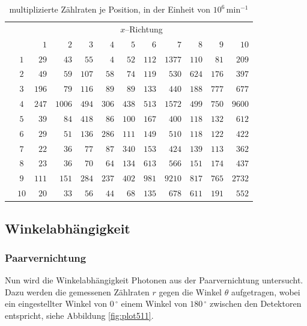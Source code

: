 \documentclass[12pt,a4paper]{scrartcl}
\numberwithin{equation}{section} %
\begin{document}
\begin{table}
	\vspace{24pt}
	\begin{tabular}{cc|rrrrrrrrrr}
		 && \multicolumn{10}{c}{$x$--Richtung} \\
		 && $1$ & $2$ & $3$ & $4$ & $5$ & $6$ & $7$ & $8$ & $9$ & $10$ \\
		 \hline
		\multirow{10}{*}{\rotatebox{90}{$y$--Richtung}} &$1$  & $29$ & $43$ & $55$ & $4$ & $52$ & $112$ & $1377$ & $110$ & $81$ & $209$ \\
		&$2$  & $49$ & $59$ & $107$ & $58$ & $74$ & $119$ & $530$ & $624$ & $176$ & $397$ \\
		&$3$  & $196$ & $79$ & $116$ & $89$ & $89$ & $133$ & $440$ & $188$ & $777$ & $677$ \\
		&$4$  & $247$ & $1006$ & $494$ & $306$ & $438$ & $513$ & $1572$ & $499$ & $750$ & $9600$ \\
		&$5$  & $39$ & $84$ & $418$ & $86$ & $100$ & $167$ & $400$ & $118$ & $132$ & $612$ \\
		&$6$  & $29$ & $51$ & $136$ & $286$ & $111$ & $149$ & $510$ & $118$ & $122$ & $422$ \\
		&$7$  & $22$ & $36$ & $77$ & $87$ & $340$ & $153$ & $424$ & $139$ & $113$ & $362$ \\
		&$8$  & $23$ & $36$ & $70$ & $64$ & $134$ & $613$ & $566$ & $151$ & $174$ & $437$ \\
		&$9$  & $111$ & $151$ & $284$ & $237$ & $402$ & $981$ & $9210$ & $817$ & $765$ & $2732$ \\
		&$10$  & $20$ & $33$ & $56$ & $44$ & $68$ & $135$ & $678$ & $611$ & $191$ & $552$ \\
	\end{tabular}
	\caption{multiplizierte Zählraten je Position, in der Einheit von $10^6\, \mathrm{min^{-1}}$}
	\label{tab:PET Matrix}
\end{table}

\clearpage
\hypertarget{winkelabhuxe4ngigkeit}{%
\subsection{Winkelabhängigkeit}\label{winkelabhuxe4ngigkeit}}

\subsubsection{Paarvernichtung}
\label{auswertung-paarvernichtung}
Nun wird die Winkelabhängigkeit Photonen aus der Paarvernichtung untersucht. Dazu werden die gemessenen Zählraten $r$ gegen die Winkel $\theta$ aufgetragen, wobei ein eingestellter Winkel von $0\,^\circ$ einem Winkel von $180\,^\circ$ zwischen den Detektoren entspricht, siehe Abbildung \ref{fig:plot511}.
\end{document}
